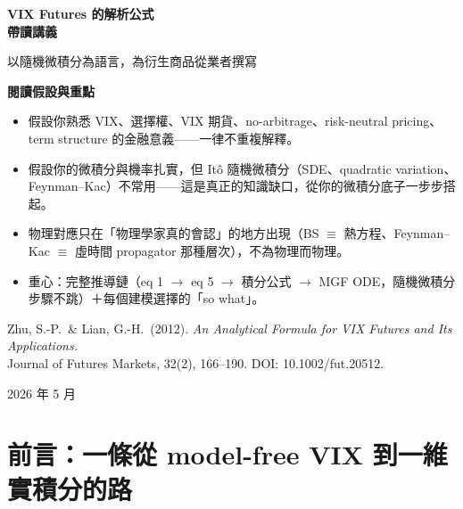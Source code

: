 \documentclass[12pt, a4paper]{article}
\theoremstyle{remark}
\begin{document}
\begin{titlepage}
\centering
\vspace*{2cm}

{\Huge\bfseries\color{physblue} VIX Futures 的解析公式\\[0.3em]
帶讀講義}

\vspace{0.8em}
{\large\color{gray}以隨機微積分為語言，為衍生商品從業者撰寫}

\vspace{2em}
\begin{tcolorbox}[enhanced, width=0.9\textwidth, colback=lightblue,
  colframe=physblue, arc=4pt]
\textbf{閱讀假設與重點}
\begin{itemize}[topsep=2pt, itemsep=2pt]
  \item 假設你熟悉 VIX、選擇權、VIX 期貨、no-arbitrage、risk-neutral pricing、term structure 的金融意義——一律不重複解釋。
  \item 假設你的微積分與機率扎實，但 Itô 隨機微積分（SDE、quadratic variation、Feynman--Kac）不常用——這是真正的知識缺口，從你的微積分底子一步步搭起。
  \item 物理對應只在「物理學家真的會認」的地方出現（BS $\equiv$ 熱方程、Feynman--Kac $\equiv$ 虛時間 propagator 那種層次），不為物理而物理。
  \item 重心：完整推導鏈（eq 1 $\to$ eq 5 $\to$ 積分公式 $\to$ MGF ODE，隨機微積分步驟不跳）＋每個建模選擇的「so what」。
\end{itemize}
\end{tcolorbox}

\vspace{2em}
{\normalsize Zhu, S.-P.\ \& Lian, G.-H.\ (2012). \textit{An Analytical Formula for VIX Futures
and Its Applications.}\\
Journal of Futures Markets, 32(2), 166--190. DOI: 10.1002/fut.20512.}

\vspace{3em}
{\normalsize 2026 年 5 月}
\vfill
\end{titlepage}

\tableofcontents
\newpage

\section*{前言：一條從 model-free VIX 到一維實積分的路}
\end{document}
